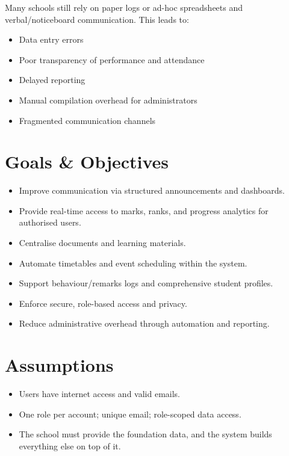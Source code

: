 \documentclass[12pt, a4paper]{report}
\begin{document}
Many schools still rely on paper logs or ad-hoc spreadsheets and verbal/noticeboard communication. This leads to:
\begin{itemize}
    \item Data entry errors
    \item Poor transparency of performance and attendance
    \item Delayed reporting
    \item Manual compilation overhead for administrators
    \item Fragmented communication channels
\end{itemize}

\section{Goals \& Objectives}

\begin{itemize}
    \item Improve communication via structured announcements and dashboards.
    \item Provide real-time access to marks, ranks, and progress analytics for authorised users.
    \item Centralise documents and learning materials.
    \item Automate timetables and event scheduling within the system.
    \item Support behaviour/remarks logs and comprehensive student profiles.
    \item Enforce secure, role-based access and privacy.
    \item Reduce administrative overhead through automation and reporting.
\end{itemize}

\section{Assumptions}

\begin{itemize}
    \item Users have internet access and valid emails.
    \item One role per account; unique email; role-scoped data access.
    \item The school must provide the foundation data, and the system builds everything else on top of it.
\end{itemize}
\end{document}
